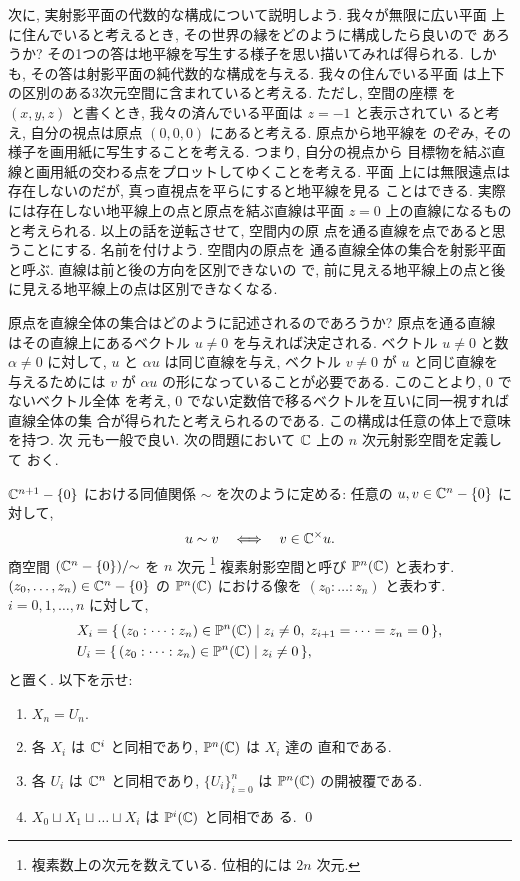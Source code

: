 \documentclass[12pt,twoside]{jarticle}
\def\setminus{-}
\def\C{{\Bbb C}} %
\def\P{{\Bbb P}}
\begin{document}
次に, 実射影平面の代数的な構成について説明しよう. 我々が無限に広い平面
上に住んでいると考えるとき, その世界の縁をどのように構成したら良いので
あろうか? その1つの答は地平線を写生する様子を思い描いてみれば得られる.
しかも, その答は射影平面の純代数的な構成を与える. 我々の住んでいる平面
は上下の区別のある3次元空間に含まれていると考える. ただし, 空間の座標
を $(x,y,z)$ と書くとき, 我々の済んでいる平面は $z=-1$ と表示されてい
ると考え, 自分の視点は原点 $(0,0,0)$ にあると考える. 原点から地平線を
のぞみ, その様子を画用紙に写生することを考える. つまり, 自分の視点から
目標物を結ぶ直線と画用紙の交わる点をプロットしてゆくことを考える. 平面
上には無限遠点は存在しないのだが, 真っ直視点を平らにすると地平線を見る
ことはできる. 実際には存在しない地平線上の点と原点を結ぶ直線は平面 %
$z=0$ 上の直線になるものと考えられる. 以上の話を逆転させて, 空間内の原
点を通る直線を点であると思うことにする. 名前を付けよう. 空間内の原点を
通る直線全体の集合を射影平面と呼ぶ. 直線は前と後の方向を区別できないの
で, 前に見える地平線上の点と後に見える地平線上の点は区別できなくなる.

原点を直線全体の集合はどのように記述されるのであろうか? 原点を通る直線
はその直線上にあるベクトル $u \ne 0$ を与えれば決定される. ベクトル %
$u\ne0$ と数 $\alpha\ne0$ に対して, $u$ と $\alpha u$ は同じ直線を与え, 
ベクトル $v\ne0$ が $u$ と同じ直線を与えるためには $v$ が $\alpha u$ 
の形になっていることが必要である. このことより, $0$ でないベクトル全体
を考え, $0$ でない定数倍で移るベクトルを互いに同一視すれば直線全体の集
合が得られたと考えられるのである. この構成は任意の体上で意味を持つ. 次
元も一般で良い. 次の問題において $\C$ 上の $n$ 次元射影空間を定義して
おく.

\begin{question}[$n$ 次元複素射影空間]
  $\C^{n+1} \setminus \{0\}$ における同値関係 $\sim$ を次のように定める:
  任意の $u,v\in \C^n \setminus \{0\}$ に対して,
  \[
    u \sim v
    \quad\Longleftrightarrow\quad
    v \in \C^{\times} u.
  \] %
  商空間 $(\C^n \setminus \{0\})/{\sim}$ を $n$ 次元%
  \footnote{複素数上の次元を数えている. 位相的には $2n$ 次元. }%
  複素射影空間と呼び $\P^n(\C)$ と表わす. 
  $(z_0,\dots,z_n)\in \C^n \setminus \{0\}$ の $\P^n(\C)$ における像を
  $(z_0:\dots:z_n)$ と表わす. 
  $i = 0,1,\dots,n$ に対して,
  \begin{align*}
  & X_i =
    \{\, (z_0:\dots:z_n) \in \P^n(\C)
    \mid z_i\ne 0,\; z_{i+1} = \dots = z_n = 0 \,\},
  \\
  & U_i =
    \{\, (z_0:\dots:z_n) \in \P^n(\C)
    \mid z_i \ne 0 \,\},
  \end{align*}
  と置く. 以下を示せ:
  \begin{enumerate}
  \item $X_n = U_n$.
  \item 各 $X_i$ は $\C^i$ と同相であり, $\P^n(\C)$ は $X_i$ 達の
    直和である.
  \item 各 $U_i$ は $\C^n$ と同相であり, $\{U_i\}_{i=0}^n$ は %
    $\P^n(\C)$ の開被覆である.
  \item $X_0\sqcup X_1\sqcup\dots\sqcup X_i$ は $\P^i(\C)$ と同相であ
    る. \qed
  \end{enumerate}
\end{question}
\end{document}
